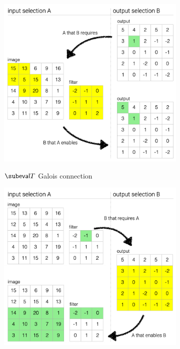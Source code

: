 \begin{figure}
   \begin{subfigure}{0.53\textwidth}
      {\includegraphics[scale=0.38]{fig/example/4-relations-1.png}}
      \vspace{2mm}
      \caption{$\GC{eval}{T}$ Galois connection}
   \end{subfigure}
   \begin{subfigure}{0.46\textwidth}
      {\includegraphics[scale=0.38]{fig/example/4-relations-2.png}}

\end{subfigure}
\end{figure}
